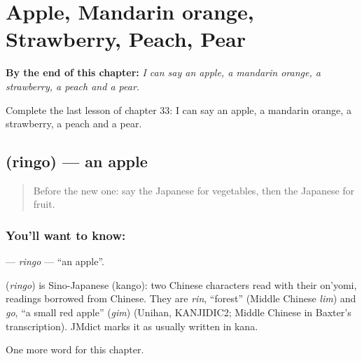 
\chapter{Apple, Mandarin orange, Strawberry, Peach, Pear}
\label{ch:ja-apple-mandarin-orange-strawberry-peach-pear}

\begin{chapteropening}
\textbf{By the end of this chapter:} \emph{I can say an apple, a mandarin orange, a strawberry, a peach and a pear.}

Complete the last lesson of chapter 33: I can say an apple, a mandarin orange, a strawberry, a peach and a pear.
\end{chapteropening}

\section[\texorpdfstring{\ja{りんご} (ringo)}{りんご (ringo)}]{ (ringo) — an apple}

\label{lesson:JA-C33-ringo}



\begin{quote}
Before the new one: say the Japanese for vegetables, then the Japanese for fruit.
\end{quote}

\subsection*{You'll want to know: }
\textbf{} — \emph{ringo} — \textquotedblleft{}an apple\textquotedblright{}.

\begin{cousinweb}
\textbf{} (\emph{ringo}) is Sino-Japanese (kango): two Chinese characters read with their on'yomi, readings borrowed from Chinese. They are \emph{rin}, \textquotedblleft{}forest\textquotedblright{} (Middle Chinese \emph{lim}) and \emph{go}, \textquotedblleft{}a small red apple\textquotedblright{} (\emph{gim}) (Unihan, KANJIDIC2; Middle Chinese in Baxter's transcription). JMdict marks it as usually written in kana.
\end{cousinweb}

\begin{grammarlens}[title={What you've built}]
One more word for this chapter.
\end{grammarlens}

